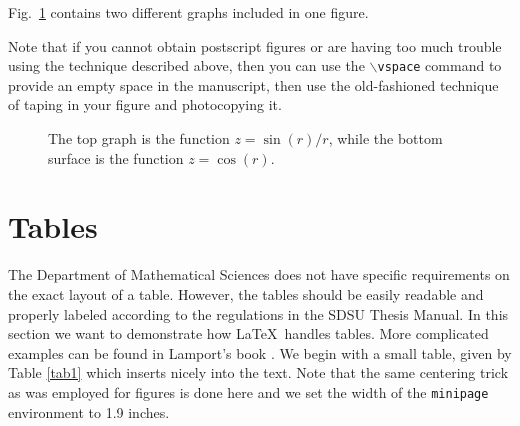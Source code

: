 Fig.~\ref{fullfig} contains two different graphs included in one figure.

Note that if you cannot obtain
postscript figures or are having too much trouble using the technique
described above, then you can use the {\tt $\backslash$vspace}
command to provide an
empty space in the manuscript, then use the old-fashioned technique of
taping in your figure and photocopying it.



%
%



\begin{figure}[htb]
\centering
\begin{minipage}{3.5in}
\hspace*{-0.5in}
\newline
\hspace*{-0.5in}
\caption{The top graph is the function $z = \sin(r)/r$, while
the bottom surface is the function $z = \cos(r)$. \label{fullfig}}
\end{minipage}
\end{figure}

\section{Tables}
\label{s:tables}

The Department of Mathematical Sciences does not have specific
requirements on the exact layout of a table. However, the tables should
be easily readable and properly labeled according to the regulations in
the SDSU Thesis Manual. In this section we want to demonstrate how
\LaTeX\ handles tables. More complicated examples can be found in
Lamport's book \cite{LAM}. We begin with a small table, given by
Table \ref{tab1} which inserts nicely into the text.  Note that the same
centering trick as was employed for figures is done here and we set the
width of the {\tt minipage} environment to 1.9 inches.
%

